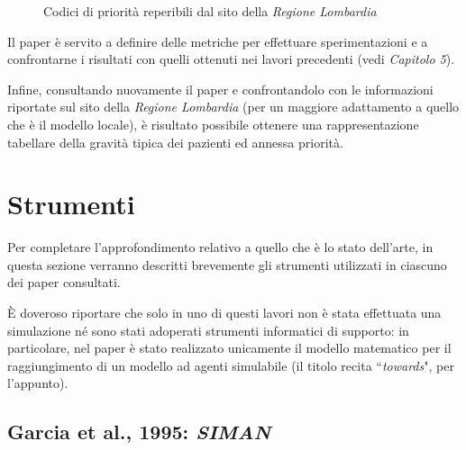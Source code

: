 \begin{figure}[!htb]
    \centering
    \caption{Codici di priorità reperibili dal sito della \textit{Regione Lombardia}}
\end{figure}

Il paper \textit{\cite{espinoza_real-time_2014}} è servito a definire delle metriche per effettuare sperimentazioni e a confrontarne i risultati con quelli ottenuti nei lavori precedenti (vedi \textit{Capitolo 5}). 

Infine, consultando nuovamente il paper \textit{\cite{garcia_reducing_1995}} e confrontandolo con le informazioni riportate sul sito della \textit{Regione Lombardia} (per un maggiore adattamento a quello che è il modello locale), è risultato possibile ottenere una rappresentazione tabellare della gravità tipica dei pazienti ed annessa priorità. 


\clearpage
\section{Strumenti}

Per completare l'approfondimento relativo a quello che è lo stato dell'arte, in questa sezione verranno descritti brevemente gli strumenti utilizzati in ciascuno dei paper consultati. 

È doveroso riportare che solo in uno di questi lavori non è stata effettuata una simulazione né sono stati adoperati strumenti informatici di supporto: in particolare, nel paper \textit{\cite{stainsby_towards_2009}} è stato realizzato unicamente il modello matematico per il raggiungimento di un modello ad agenti simulabile (il titolo recita ``\textit{towards}", per l'appunto).

\subsection{Garcia et al., 1995: \textit{SIMAN}}

